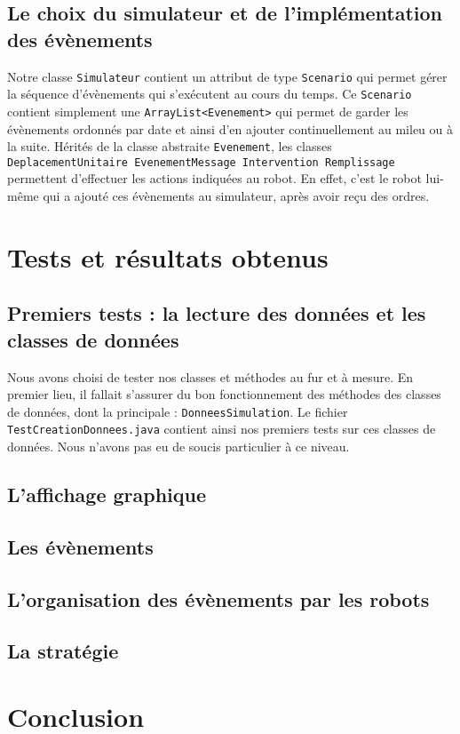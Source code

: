 \documentclass[12pt]{article}
\begin{document}
\subsection{Le choix du simulateur et de l'implémentation des évènements}
Notre classe {\tt Simulateur} contient un attribut de type {\tt Scenario} qui permet gérer la séquence d'évènements qui s'exécutent au cours du temps. Ce {\tt Scenario} contient simplement une {\tt ArrayList<Evenement>} qui permet de garder les évènements ordonnés par date et ainsi d'en ajouter continuellement au mileu ou à la suite.
Hérités de la classe abstraite {\tt Evenement}, les classes {\tt DeplacementUnitaire EvenementMessage Intervention Remplissage} permettent d'effectuer les actions indiquées au robot. En effet, c'est le robot lui-même qui a ajouté ces évènements au simulateur, après avoir reçu des ordres.


\section{Tests et résultats obtenus}

\subsection{Premiers tests : la lecture des données et les classes de données}

Nous avons choisi de tester nos classes et méthodes au fur et à mesure. En premier lieu, il fallait s'assurer du bon fonctionnement des méthodes des classes de données, dont la principale : {\tt DonneesSimulation}. Le fichier {\tt TestCreationDonnees.java} contient ainsi nos premiers tests sur ces classes de données. Nous n'avons pas eu de soucis particulier à ce niveau.

\subsection{L'affichage graphique}

\subsection{Les évènements}

\subsection{L'organisation des évènements par les robots}

\subsection{La stratégie}



\section{Conclusion}
\end{document}
